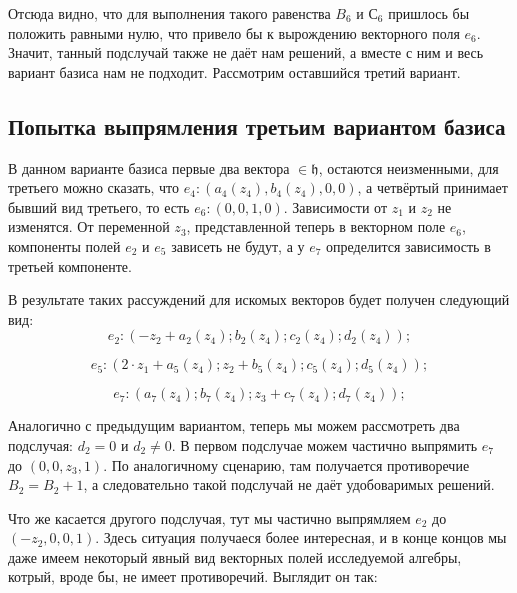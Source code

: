 \documentclass[a4paper]{article}
\begin{document}
Отсюда видно, что для выполнения такого равенства $B_{6}$ и $С_{6}$ пришлось бы положить равными нулю, что привело бы к вырождению векторного поля $e_{6}$. Значит, танный подслучай также не даёт нам решений, а вместе с ним и весь вариант базиса нам не подходит. Рассмотрим оставшийся третий вариант.

\subsection{Попытка выпрямления третьим вариантом базиса}
В данном варианте базиса первые два вектора $\in \mathfrak{h}$, остаются неизменными, для третьего можно сказать, что $e_{4}:(a_{4}(z_{4}), b_{4}(z_{4}), 0, 0)$, а четвёртый принимает бывший вид третьего, то есть $e_{6}:(0,0,1,0)$. Зависимости от $z_{1}$ и $z_{2}$ не изменятся. От переменной $z_{3}$, представленной теперь в векторном поле $e_{6}$, компоненты полей $e_{2}$ и $e_{5}$ зависеть не будут, а у $e_{7}$ определится зависимость в третьей компоненте.

В результате таких рассуждений для искомых векторов будет получен следующий вид:
\begin{equation}
e_{2}:(-z_{2} + a_{2}(z_{4}) ; b_{2}(z_{4}) ; c_{2}(z_{4}) ; d_{2}(z_{4}));
\end{equation}

\begin{equation}
e_{5}:(2\cdot z_{1} + a_{5}(z_{4}) ; z_{2} + b_{5}(z_{4}) ; c_{5}(z_{4}) ; d_{5}(z_{4}));
\end{equation}

\begin{equation}
e_{7}:( a_{7}(z_{4}) ; b_{7}(z_{4}) ; z_{3} + c_{7}(z_{4}) ; d_{7}(z_{4}));
\end{equation}

Аналогично с предыдущим вариантом, теперь мы можем рассмотреть два подслучая: $d_{2}=0$ и $d_{2}\neq 0$. В первом подслучае можем частично выпрямить $e_{7}$ до $(0,0,z_{3},1)$. По аналогичному сценарию, там получается противоречие $B_{2}=B_{2}+1$, а следовательно такой подслучай не даёт удобоваримых решений.

Что же касается другого подслучая, тут мы частично выпрямляем $e_{2}$ до $(-z_{2},0,0,1)$. Здесь ситуация получаеся более интересная, и в конце концов мы даже имеем некоторый явный вид векторных полей исследуемой алгебры, котрый, вроде бы, не имеет противоречий. Выглядит он так:
\end{document}
